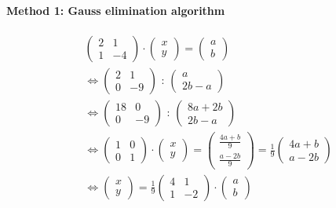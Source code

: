 \documentclass[notitlepage]{math}
\begin{document}
\paragraph{Method 1: Gauss elimination algorithm}
\begin{align*}
    &\begin{pmatrix} 2 & 1 \\
            1 & -4
    \end{pmatrix} \cdot \begin{pmatrix} x \\ y \end{pmatrix} = \begin{pmatrix} a \\ b \end{pmatrix} \\
    &\Longleftrightarrow \begin{pmatrix} 2 & 1 \\
                 0 & -9 
    \end{pmatrix} \text{ : } \begin{pmatrix} a \\ 2b-a \end{pmatrix} \\
    &\Longleftrightarrow \begin{pmatrix} 18 & 0 \\
             0 & -9
    \end{pmatrix} \text{ : } \begin{pmatrix} 8a  + 2b\\ 2b-a \end{pmatrix} \\
    &\Longleftrightarrow \begin{pmatrix} 1 & 0 \\ 0 & 1 \end{pmatrix} \cdot \begin{pmatrix} x \\ y \end{pmatrix} 
    = \begin{pmatrix} \frac{4a + b}{9} \\ \frac{a-2b}{9} \end{pmatrix} = \frac{1}{9} \begin{pmatrix} 4a + b \\ a-2b \end{pmatrix} \\
    &\Longleftrightarrow \begin{pmatrix} x \\ y \end{pmatrix} = \frac{1}{9} \begin{pmatrix} 4& 1 \\ 1 & -2 \end{pmatrix} \cdot \begin{pmatrix} a \\ b \end{pmatrix} \\
\end{align*}
\end{document}
